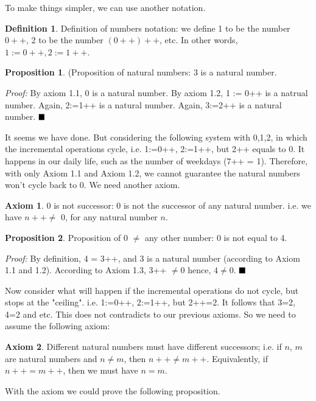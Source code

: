 \documentclass{article}
\theoremstyle{definition}
\newtheorem{defi}{Definition}[section]
\newtheorem{axiom}{Axiom}[section]
\newtheorem{proposition}{Proposition}[section]
\begin{document}
To make things simpler, we can use another notation.

\begin{defi}
Definition of numbers notation: we define 1 to be the number $0++$, 2 to be the number $(0++)++$, etc. In other words, $1 := 0++, 2 := 1++$.
\end{defi}

\begin{proposition}
(Proposition of natural numbers: 3 is a natural number.
\end{proposition}

\textit{Proof:} By axiom 1.1, 0 is a natural number. By axiom 1.2, 1 := 0++ is a natrual number. Again, 2:=1++ is a natural number. Again, 3:=2++ is a natural number. $\hfill\blacksquare$

It seems we have done. But considering the following system with 0,1,2, in which the incremental operations cycle, i.e. 1:=0++, 2:=1++, but 2++ equals to 0. It happens in our daily life, such as the number of weekdays (7++ = 1). Therefore, with only Axiom 1.1 and Axiom 1.2, we cannot guarantee the natural numbers won't cycle back to 0. We need another axiom.

\begin{axiom}
0 is not successor: 0 is not the successor of any natural number. i.e. we have $ n++ \neq$ 0, for any natural number $n$.
\end{axiom}

\begin{proposition}
Proposition of 0 $\neq$ any other number: 0 is not equal to 4.
\end{proposition}

\textit{Proof:} By definition, 4 = 3++, and 3 is a natural number (according to Axiom 1.1 and 1.2). According to Axiom 1.3, 3++ $\neq 0$ hence, $4 \neq 0$. $\hfill\blacksquare$

Now consider what will happen if the incremental operations do not cycle, but stops at the "ceiling". i.e. 1:=0++, 2:=1++, but 2++=2. It follows that 3=2, 4=2 and etc. This does not contradicts to our previous axioms. So we need to assume the following axiom:

\begin{axiom}
Different natural numbers must have different successors; i.e. if $n$, $m$ are natural numbers and $n \neq m$, then $n++ \neq m++$. Equivalently, if $n++ = m++$, then we must have $n=m$.
\end{axiom}

With the axiom we could prove the following proposition.
\end{document}
